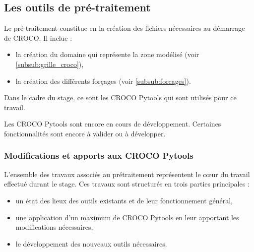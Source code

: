 \documentclass[10pt,a4paper,titlepage]{article}
\begin{document}
\subsection{Les outils de pré-traitement}
\label{sub:outils_pretraitement}
Le pré-traitement constitue en la création des fichiers nécessaires au démarrage de CROCO.
Il inclue :
\begin{itemize}
    \item la création du domaine qui représente la zone modélisé (voir \ref{subsub:grille_croco}),
    \item la création des différents forçages (voir \ref{subsub:forcages}).
\end{itemize}

Dans le cadre du stage, ce sont les CROCO Pytools qui sont utilisés pour ce travail.

Les CROCO Pytools sont encore en cours de développement. %
Certaines fonctionnalités sont encore à valider ou à développer.



\subsubsection{Modifications et apports aux CROCO Pytools}
L'ensemble des travaux associés au prétraitement représentent le c\oe{}ur du travail effectué durant le stage.
Ces travaux sont structurés en trois parties principales :
\begin{itemize}
    \item un état des lieux des outils existants et de leur fonctionnement général,
    \item une application d'un maximum de CROCO Pytools en leur apportant les modifications nécessaires,
    \item le développement des nouveaux outils nécessaires.
\end{itemize}
\end{document}
